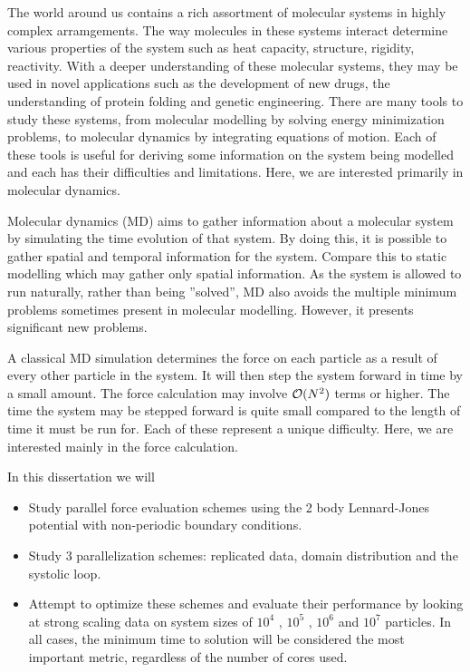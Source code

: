 %
%

%
%
%

The world around us contains
a rich assortment of molecular systems in
highly complex arramgements.
%
The way molecules in these systems interact determine various properties
of the system such as heat capacity, structure, rigidity, reactivity.
%
With a deeper understanding of these molecular systems,
they may be used in novel applications such as
the development of new drugs,
the understanding of protein folding and
genetic engineering.
%
There are many tools to study these systems,
from molecular modelling by solving energy minimization problems,
to molecular dynamics by integrating equations of motion.
%
Each of these tools is useful for
deriving some information on the system being modelled and
each has their difficulties and limitations.
%
Here, we are interested primarily in molecular dynamics.

Molecular dynamics (MD) aims to
gather information about a molecular system by
simulating the time evolution of that system.
%
By doing this, it is possible to
gather spatial and temporal information for the system.
%
Compare this to static modelling which may gather only spatial information.
%
As the system is allowed to run naturally, rather than being ”solved”,
MD also avoids the multiple minimum problems
sometimes present in molecular modelling.
%
However, it presents significant new problems.

A classical MD simulation determines
the force on each particle as a result of
every other particle in the system.
%
It will then step the system forward in time by a small amount.
%
The force calculation may involve $\mathcal{O}{(N^2)}$ terms or higher.
%
The time the system may be stepped forward is
quite small compared to the length of time it must be run for.
%
Each of these represent a unique difficulty.
%
Here, we are interested mainly in the force calculation.


%
%
%
In this dissertation we will
\begin{itemize}
\item
    Study parallel force evaluation schemes using
    the 2 body Lennard-Jones potential with
    non-periodic boundary conditions.

\item
    Study 3 parallelization schemes:
    replicated data, domain distribution and the systolic loop.

\item
    Attempt to optimize these schemes and
    evaluate their performance by looking at
    strong scaling data on system sizes of
    $10^4$ , $10^5$ , $10^6$ and $10^7$ particles.
    In all cases, the minimum time to solution will be
    considered the most important metric,
    regardless of the number of cores used.
\end  {itemize}
